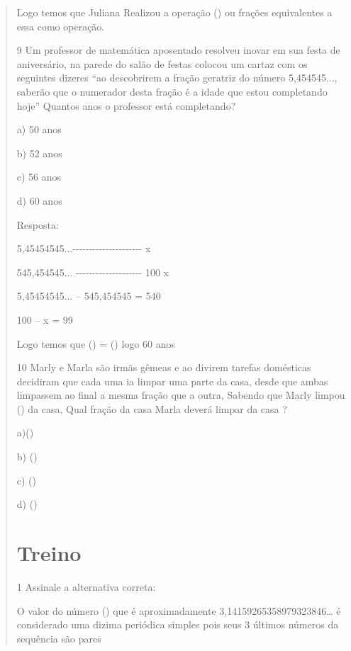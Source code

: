 \begin{quote}
Logo temos que Juliana Realizou a operação () ou frações
equivalentes a essa como operação.

\num{9} Um professor de matemática aposentado resolveu inovar em sua festa de
aniversário, na parede do salão de festas colocou um cartaz com os
seguintes dizeres ``ao descobrirem a fração geratriz do número
5,454545..., saberão que o numerador desta fração é a idade que estou
completando hoje'' Quantos anos o professor está completando?

a) 50 anos

b) 52 anos

c) 56 anos

d) 60 anos


Resposta:

5,45454545...-\/-\/-\/-\/-\/-\/-\/-\/-\/-\/-\/-\/-\/-\/-\/-\/-\/-\/-\/-\/-
x

545,454545... -\/-\/-\/-\/-\/-\/-\/-\/-\/-\/-\/-\/-\/-\/-\/-\/-\/-\/-\/-
100 x

5,45454545... -- 545,454545 = 540

100 -- x = 99

Logo temos que () = () logo 60 anos

\num{10} Marly e Marla são irmãs gêmeas e ao divirem tarefas domésticas
decidiram que cada uma ia limpar uma parte da casa, desde que ambas
limpassem ao final a mesma fração que a outra, Sabendo que Marly limpou
() da casa, Qual fração da casa Marla deverá limpar da casa
?

a)()

b) ()

c) ()

d) ()


\section{Treino}

\num{1} Assinale a alternativa correta:

\begin{escolha}
\item  O valor do número (\pi) que é aproximadamente
3,14159265358979323846\ldots{} é considerado uma dizima periódica
simples pois seus 3 últimos números da sequência são pares


\end{escolha}
\end{quote}
